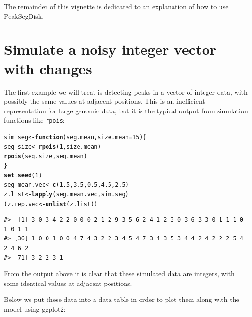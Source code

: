 \documentclass[12pt]{article}\usepackage[]{graphicx}\usepackage[]{color}
\makeatletter
\newcommand{\hlnum}[1]{\textcolor[rgb]{0.686,0.059,0.569}{#1}}%
\newcommand{\hlstd}[1]{\textcolor[rgb]{0.345,0.345,0.345}{#1}}%
\newcommand{\hlkwa}[1]{\textcolor[rgb]{0.161,0.373,0.58}{\textbf{#1}}}%
\newcommand{\hlkwb}[1]{\textcolor[rgb]{0.69,0.353,0.396}{#1}}%
\newcommand{\hlkwc}[1]{\textcolor[rgb]{0.333,0.667,0.333}{#1}}%
\newcommand{\hlkwd}[1]{\textcolor[rgb]{0.737,0.353,0.396}{\textbf{#1}}}%
\newenvironment{kframe}{%
 \def\at@end@of@kframe{}%
 \ifinner\ifhmode%
  \def\at@end@of@kframe{\end{minipage}}%
  \begin{minipage}{\columnwidth}%
 \fi\fi%
 \def\FrameCommand##1{\hskip\@totalleftmargin \hskip-\fboxsep
 \colorbox{shadecolor}{##1}\hskip-\fboxsep
     \hskip-\linewidth \hskip-\@totalleftmargin \hskip\columnwidth}%
 \MakeFramed {\advance\hsize-\width
   \@totalleftmargin\z@ \linewidth\hsize
   \@setminipage}}%
 {\par\unskip\endMakeFramed%
 \at@end@of@kframe}
\newenvironment{knitrout}{}{} %
\makeatother
\begin{document}
The remainder of this vignette is dedicated to an explanation of how
to use PeakSegDisk.

\section{Simulate a noisy integer vector with changes}

The first example we will treat is detecting peaks in a vector of
integer data, with possibly the same values at adjacent
positions. This is an inefficient representation for large genomic
data, but it is the typical output from simulation functions like
\texttt{rpois}:

\begin{knitrout}
\color{fgcolor}\begin{kframe}
\begin{alltt}
\hlstd{sim.seg} \hlkwb{<-} \hlkwa{function}\hlstd{(}\hlkwc{seg.mean}\hlstd{,} \hlkwc{size.mean}\hlstd{=}\hlnum{15}\hlstd{)\{}
  \hlstd{seg.size} \hlkwb{<-} \hlkwd{rpois}\hlstd{(}\hlnum{1}\hlstd{, size.mean)}
  \hlkwd{rpois}\hlstd{(seg.size, seg.mean)}
\hlstd{\}}
\hlkwd{set.seed}\hlstd{(}\hlnum{1}\hlstd{)}
\hlstd{seg.mean.vec} \hlkwb{<-} \hlkwd{c}\hlstd{(}\hlnum{1.5}\hlstd{,} \hlnum{3.5}\hlstd{,} \hlnum{0.5}\hlstd{,} \hlnum{4.5}\hlstd{,} \hlnum{2.5}\hlstd{)}
\hlstd{z.list} \hlkwb{<-} \hlkwd{lapply}\hlstd{(seg.mean.vec, sim.seg)}
\hlstd{(z.rep.vec} \hlkwb{<-} \hlkwd{unlist}\hlstd{(z.list))}
\end{alltt}
\begin{verbatim}
#>  [1] 3 0 3 4 2 2 0 0 0 2 1 2 9 3 5 6 2 4 1 2 3 0 3 6 3 3 0 1 1 1 0 1 0 1 1
#> [36] 1 0 0 1 0 0 4 7 4 3 2 2 3 4 5 4 7 3 4 3 5 3 4 4 2 4 2 2 2 5 4 2 4 6 2
#> [71] 3 2 2 3 1
\end{verbatim}
\end{kframe}
\end{knitrout}

From the output above it is clear that these simulated data are
integers, with some identical values at adjacent positions. 

Below we put these data into a data table in order to plot them along
with the model using ggplot2:
\end{document}
